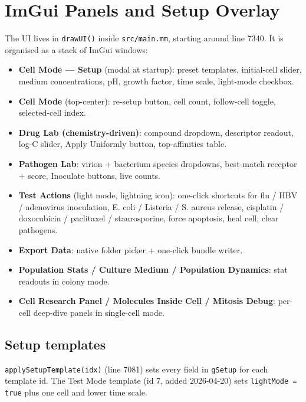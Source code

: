 \documentclass[11pt,letterpaper,twoside,openany]{book}
\newcommand{\code}[1]{\texttt{#1}}
\newcommand{\file}[1]{\texttt{\small#1}}
\begin{document}
\chapter{ImGui Panels and Setup Overlay}
\label{ch:ui}

The UI lives in \code{drawUI()} inside \file{src/main.mm}, starting
around line 7340. It is organised as a stack of ImGui windows:

\begin{itemize}
  \item \textbf{Cell Mode --- Setup} (modal at startup): preset
        templates, initial-cell slider, medium concentrations, pH,
        growth factor, time scale, light-mode checkbox.
  \item \textbf{Cell Mode} (top-center): re-setup button, cell
        count, follow-cell toggle, selected-cell index.
  \item \textbf{Drug Lab (chemistry-driven)}: compound dropdown,
        descriptor readout, log-C slider, Apply Uniformly button,
        top-affinities table.
  \item \textbf{Pathogen Lab}: virion + bacterium species
        dropdowns, best-match receptor + score, Inoculate buttons,
        live counts.
  \item \textbf{Test Actions} (light mode, lightning icon):
        one-click shortcuts for flu / HBV / adenovirus inoculation,
        E. coli / Listeria / S. aureus release, cisplatin /
        doxorubicin / paclitaxel / staurosporine, force apoptosis,
        heal cell, clear pathogens.
  \item \textbf{Export Data}: native folder picker + one-click
        bundle writer.
  \item \textbf{Population Stats / Culture Medium / Population
        Dynamics}: stat readouts in colony mode.
  \item \textbf{Cell Research Panel / Molecules Inside Cell /
        Mitosis Debug}: per-cell deep-dive panels in single-cell
        mode.
\end{itemize}

\section{Setup templates}

\code{applySetupTemplate(idx)} (line 7081) sets every field in
\code{gSetup} for each template id. The Test Mode template (id 7,
added 2026-04-20) sets \code{lightMode = true} plus one cell
and lower time scale.
\end{document}
